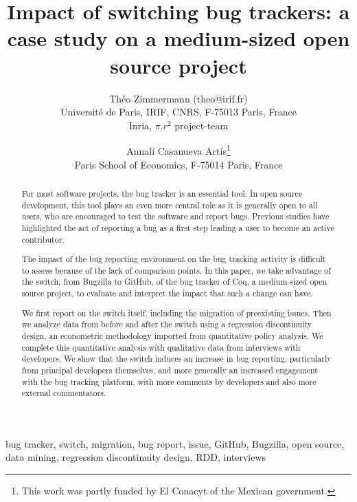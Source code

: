 \documentclass[conference]{IEEEtran}
\begin{document}
%
\title{Impact of switching bug trackers: a case study on a medium-sized open source project}
%
\author{Th\'eo Zimmermann (theo@irif.fr)\\
Universit\'e de Paris, IRIF, CNRS, F-75013 Paris, France\\
Inria, $\pi.r^2$ project-team
\and
Annal\'i Casanueva Art\'is\thanks{This work was partly funded by El Conacyt of the Mexican government.}\\
Paris School of Economics, F-75014 Paris, France}
%
\maketitle
%
\begin{abstract}
For most software projects, the bug tracker is an essential tool. In open source development, this tool plays an even more central role as it is generally open to all users, who are encouraged to test the software and report bugs. Previous studies have highlighted the act of reporting a bug as a first step leading a user to become an active contributor.

The impact of the bug reporting environment on the bug tracking activity is difficult to assess because of the lack of comparison points. In this paper, we take advantage of the switch, from Bugzilla to GitHub, of the bug tracker of Coq, a medium-sized open source project, to evaluate and interpret the impact that such a change can have.

We first report on the switch itself, including the migration of preexisting issues. Then we analyze data from before and after the switch using a regression discontinuity design, an econometric methodology imported from quantitative policy analysis. We complete this quantitative analysis with qualitative data from interviews with developers.
We show that the switch induces an increase in bug reporting, particularly from principal developers themselves, and more generally an increased engagement with the bug tracking platform, with more comments by developers and also more external commentators.
\end{abstract}


\begin{IEEEkeywords}
bug tracker, switch, migration, bug report, issue, GitHub, Bugzilla, open source, data mining, regression discontinuity design, RDD, interviews
\end{IEEEkeywords}
%
%
%
\end{document}
